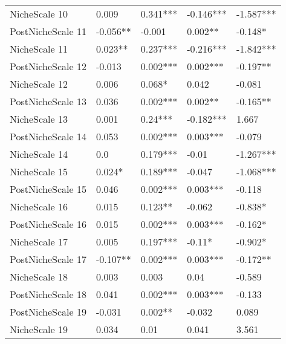 \begin{longtable}[h!]{lllll}
NicheScale 10     &               0.009 &    0.341*** &  -0.146*** &  -1.587*** \\
PostNicheScale 11 &            -0.056** &      -0.001 &    0.002** &    -0.148* \\
NicheScale 11     &             0.023** &    0.237*** &  -0.216*** &  -1.842*** \\
PostNicheScale 12 &              -0.013 &    0.002*** &   0.002*** &   -0.197** \\
NicheScale 12     &               0.006 &      0.068* &      0.042 &     -0.081 \\
PostNicheScale 13 &               0.036 &    0.002*** &    0.002** &   -0.165** \\
NicheScale 13     &               0.001 &     0.24*** &  -0.182*** &      1.667 \\
PostNicheScale 14 &               0.053 &    0.002*** &   0.003*** &     -0.079 \\
NicheScale 14     &                 0.0 &    0.179*** &      -0.01 &  -1.267*** \\
NicheScale 15     &              0.024* &    0.189*** &     -0.047 &  -1.068*** \\
PostNicheScale 15 &               0.046 &    0.002*** &   0.003*** &     -0.118 \\
NicheScale 16     &               0.015 &     0.123** &     -0.062 &    -0.838* \\
PostNicheScale 16 &               0.015 &    0.002*** &   0.003*** &    -0.162* \\
NicheScale 17     &               0.005 &    0.197*** &     -0.11* &    -0.902* \\
PostNicheScale 17 &            -0.107** &    0.002*** &   0.003*** &   -0.172** \\
NicheScale 18     &               0.003 &       0.003 &       0.04 &     -0.589 \\
PostNicheScale 18 &               0.041 &    0.002*** &   0.003*** &     -0.133 \\
PostNicheScale 19 &              -0.031 &     0.002** &     -0.032 &      0.089 \\
NicheScale 19     &               0.034 &        0.01 &      0.041 &      3.561 \\
\end{longtable}
